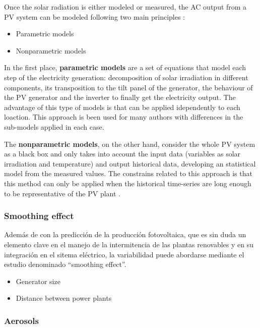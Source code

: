 Once the solar radiation is either modeled or measured, the AC output from a PV system can be modeled following two main principles \cite*{Almeida2015}:

\begin{itemize}
\item Parametric models
\item Nonparametric models
\end{itemize}

In the first place, \textbf{parametric models} are a set of equations that model each step of the electricity generation: decomposition of solar irradiation in different components, its transposition to the tilt panel of the generator, the behaviour of the PV generator and the inverter to finally get the electricity output. The advantage of this type of models is that can be applied idependently to each loaction. This approach is been used for many authors \cite*{Bofinger2006, Lorenz2008, Lorenz2011} with differences in the sub-models applied in each case.

The \textbf{nonparametric models}, on the other hand, consider the whole PV system as a black box and only takes into account the input data (variables as solar irradiation and temperature) and output historical data, developing an statistical model from the measured values. The constrains related to this approach is that this method can only be applied when the historical time-series are long enough to be representative of the PV plant \cite*{Bacher2009}. 

\subsubsection{Smoothing effect}

Además de con la predicción de la producción fotovoltaica, que es sin duda un elemento clave en el manejo de la intermitencia de las plantas renovables y en su integración en el sitema eléctrico, la variabilidad puede abordarse mediante el estudio denominado ``smoothing effect''.

\begin{itemize}
\item{Generator size}
\item{Distance between power plants}
\end{itemize}

\subsubsection{Aerosols}

